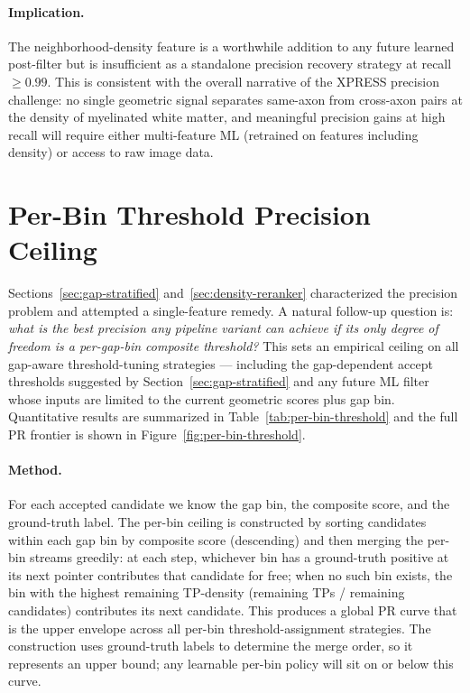 \paragraph{Implication.}
The neighborhood-density feature is a worthwhile addition to any future
learned post-filter but is insufficient as a standalone precision
recovery strategy at recall $\geq 0.99$.  This is consistent with the
overall narrative of the XPRESS precision challenge: no single
geometric signal separates same-axon from cross-axon pairs at the
density of myelinated white matter, and meaningful precision gains at
high recall will require either multi-feature ML (retrained on features
including density) or access to raw image data.

\section{Per-Bin Threshold Precision Ceiling}
\label{sec:per-bin-threshold}

Sections~\ref{sec:gap-stratified} and~\ref{sec:density-reranker}
characterized the precision problem and attempted a single-feature
remedy.  A natural follow-up question is: \emph{what is the best
precision any pipeline variant can achieve if its only degree of
freedom is a per-gap-bin composite threshold?}  This sets an empirical
ceiling on all gap-aware threshold-tuning strategies --- including
the gap-dependent accept thresholds suggested by Section~\ref{sec:gap-stratified}
and any future ML filter whose inputs are limited to the current
geometric scores plus gap bin.  Quantitative results are summarized in
Table~\ref{tab:per-bin-threshold} and the full PR frontier is shown
in Figure~\ref{fig:per-bin-threshold}.

\paragraph{Method.}
For each accepted candidate we know the gap bin, the composite score,
and the ground-truth label.  The per-bin ceiling is constructed
by sorting candidates within each gap bin by composite score
(descending) and then merging the per-bin streams greedily: at each
step, whichever bin has a ground-truth positive at its next pointer
contributes that candidate for free; when no such bin exists, the bin
with the highest remaining TP-density (remaining TPs / remaining
candidates) contributes its next candidate.  This produces a global
PR curve that is the upper envelope across all per-bin
threshold-assignment strategies.  The construction uses ground-truth
labels to determine the merge order, so it represents an upper bound;
any learnable per-bin policy will sit on or below this curve.

